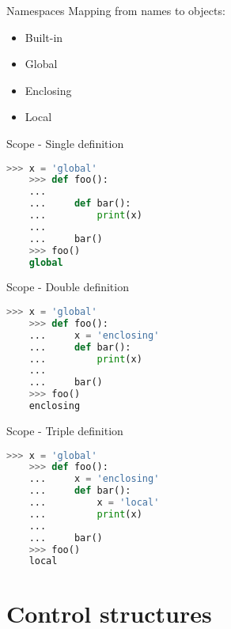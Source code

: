 \documentclass{beamer}
\begin{document}
\begin{frame}{Namespaces}
    Mapping from names to objects:\pause
    \begin{itemize}
        \item<2-> Built-in
        \item<3-> Global
        \item<4-> Enclosing
        \item<4-> Local
    \end{itemize}

\end{frame}

\begin{frame}[fragile]{Scope - Single definition}
    \begin{lstlisting}[language=Python]
    >>> x = 'global'
    >>> def foo():
    ...
    ...     def bar():
    ...         print(x)
    ...        
    ...     bar()
    >>> foo() 
    global
    \end{lstlisting}
\end{frame}

\begin{frame}[fragile]{Scope - Double definition}
    \begin{lstlisting}[language=Python]
    >>> x = 'global'
    >>> def foo():
    ...     x = 'enclosing'
    ...     def bar():
    ...         print(x)
    ...        
    ...     bar()
    >>> foo() 
    enclosing
    \end{lstlisting}
\end{frame}

\begin{frame}[fragile]{Scope - Triple definition}
    \begin{lstlisting}[language=Python]
    >>> x = 'global'
    >>> def foo():
    ...     x = 'enclosing'
    ...     def bar():
    ...         x = 'local'
    ...         print(x)
    ...        
    ...     bar()
    >>> foo() 
    local
    \end{lstlisting}
\end{frame}

\section{Control structures}
\end{document}
